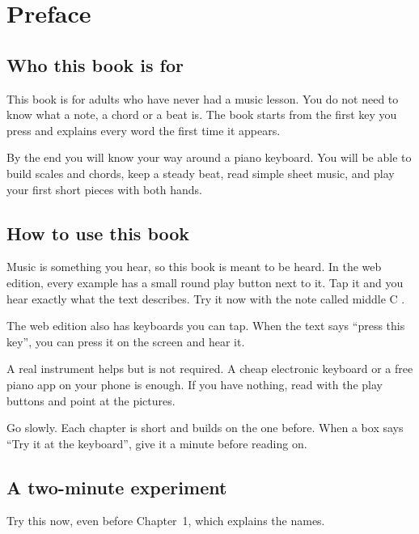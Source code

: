 \chapter*{Preface}

\section*{Who this book is for}

This book is for adults who have never had a music lesson. You do not need to know what a note, a chord or a beat is. The book starts from the first key you press and explains every word the first time it appears.

By the end you will know your way around a piano keyboard. You will be able to build scales and chords, keep a steady beat, read simple sheet music, and play your first short pieces with both hands.

\section*{How to use this book}

Music is something you hear, so this book is meant to be heard. In the web edition, every example has a small round play button next to it. Tap it and you hear exactly what the text describes. Try it now with the note called middle C .

The web edition also has keyboards you can tap. When the text says ``press this key'', you can press it on the screen and hear it.

A real instrument helps but is not required. A cheap electronic keyboard or a free piano app on your phone is enough. If you have nothing, read with the play buttons and point at the pictures.

Go slowly. Each chapter is short and builds on the one before. When a box says ``Try it at the keyboard'', give it a minute before reading on.

\section*{A two-minute experiment}

Try this now, even before Chapter~1, which explains the names.

